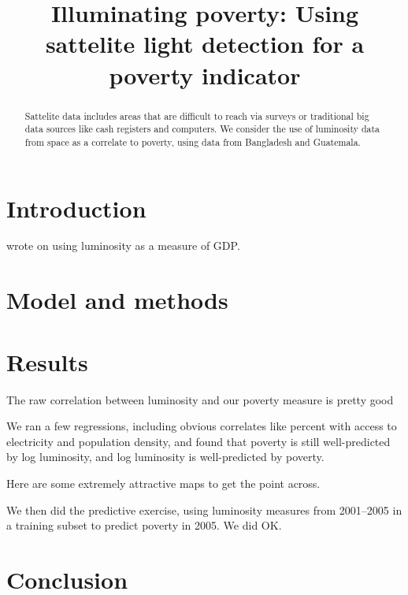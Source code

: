 \documentclass{article}
\begin{document}
\title{Illuminating poverty: Using sattelite light detection for a poverty indicator}
\maketitle
\begin{abstract}
Sattelite data includes areas that are difficult to reach via surveys or traditional big
data sources like cash registers and computers. We consider the use of luminosity data
from space as a correlate to poverty, using data from Bangladesh and Guatemala.
\end{abstract}

\section{Introduction}

\citet{chen:pnas} wrote on using luminosity as a measure of GDP.

\section{Model and methods}

\section{Results}
The raw correlation between luminosity and our poverty measure is pretty good

We ran a few regressions, including obvious correlates like percent with access to
electricity and population density, and found that poverty is still well-predicted by
log luminosity, and log luminosity is well-predicted by poverty.

Here are some extremely attractive maps to get the point across.

We then did the predictive exercise, using luminosity measures from 2001--2005 in a
training subset to predict poverty in 2005. We did OK.

\section{Conclusion}




\end{document}
